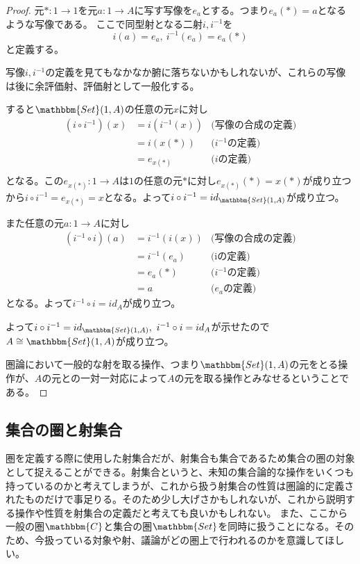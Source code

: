 \documentclass[uplatex,dvipdfmx]{jsarticle}
\newcommand{\cat}[1]{\mathbbm{#1}}
\newcommand{\arrow}{\rightarrow}
\newcommand{\mor}[3]{#1:#2\arrow #3}
\newcommand{\arset}[3]{\cat{#1}(#2,#3)}
\newtheorem{proof}{証明}[section]
\numberwithin{proof}{subsection}
\numberwithin{prop}{subsection}
\numberwithin{define}{subsection}
\begin{document}
	\begin{proof}
		元$\mor{*}{1}{1}$を元$\mor{a}{1}{A}$に写す写像を$e_a$とする。つまり$e_a(*)=a$となるような写像である。
		ここで同型射となる二射$i,i^{-1}$を\[i(a)=e_a,\ i^{-1}(e_a)=e_a(*)\]と定義する。

    写像$i,i^{-1}$の定義を見てもなかなか腑に落ちないかもしれないが、これらの写像は後に余評価射、評価射として一般化する。

		\begin{center}
		\end{center}
		すると$\arset{Set}{1}{A}$の任意の元$x$に対し
			\begin{align*}
				(i\circ i^{-1})(x)&=i(i^{-1}(x))&\text{(写像の合成の定義)}\\
				&=i(x(*))&\text{($i^{-1}$の定義)}\\
				&=e_{x(*)}&\text{($i$の定義)}\\
			\end{align*}
		となる。この$\mor{e_{x(*)}}{1}{A}$は$1$の任意の元$*$に対し$e_{x(*)}(*)=x(*)$が成り立つから$i\circ i^{-1}=e_{x(*)}=x$となる。よって$i\circ i^{-1}=id_{\arset{Set}{1}{A}}$が成り立つ。

		また任意の元$\mor{a}{1}{A}$に対し
		\begin{align*}
			(i^{-1}\circ i)(a)&=i^{-1}(i(x))&\text{(写像の合成の定義)}\\
			&=i^{-1}(e_a)&\text{(iの定義)}\\
			&=e_a(*)&\text{($i^{-1}$の定義)}\\
			&=a&\text{($e_a$の定義)}
		\end{align*}
		となる。よって$i^{-1}\circ i=id_A$が成り立つ。

		よって$i\circ i^{-1}=id_{\arset{Set}{1}{A}},\ i^{-1}\circ i=id_A$が示せたので$A\cong\arset{Set}{1}{A}$が成り立つ。

		圏論において一般的な射を取る操作、つまり$\arset{Set}{1}{A}$の元をとる操作が、$A$の元との一対一対応によって$A$の元を取る操作とみなせるということである。
	\end{proof}

  \subsection{集合の圏と射集合}
	圏を定義する際に使用した射集合だが、射集合も集合であるため集合の圏の対象として捉えることができる。射集合というと、未知の集合論的な操作をいくつも持っているのかと考えてしまうが、これから扱う射集合の性質は圏論的に定義されたものだけで事足りる。そのため少し大げさかもしれないが、これから説明する操作や性質を射集合の定義だと考えても良いかもしれない。
  また、ここから一般の圏$\cat{C}$と集合の圏$\cat{Set}$を同時に扱うことになる。そのため、今扱っている対象や射、議論がどの圏上で行われるのかを意識してほしい。
\end{document}
